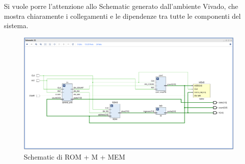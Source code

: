 Si vuole porre l'attenzione allo Schematic generato dall'ambiente Vivado, che mostra chiaramente i collegamenti e le dipendenze tra tutte le componenti del sistema.
\begin{figure}[H]
	\centering
	\includegraphics[width=1\textwidth]{img/schematic_ROM_M_MEM.PNG}
	\caption{Schematic di ROM + M + MEM}
	\label{schemROM_M_MEM} 
\end{figure}
